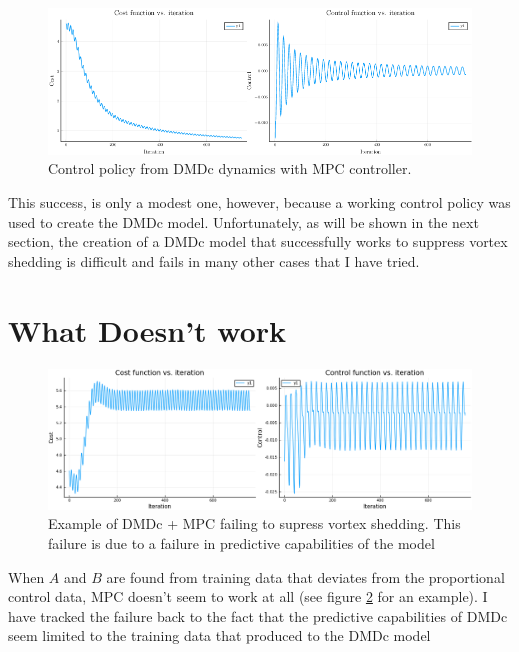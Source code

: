 \documentclass{article}
\begin{document}
\begin{figure}
  \centering
  \includegraphics[scale=0.5]{../images/dmdc_working.png}
  \caption{Control policy from DMDc dynamics with MPC controller.}
  \label{fig:dmdc_working}
\end{figure}


This success, is only a modest one, however, because a working control policy was used to create the DMDc model. Unfortunately, as will be shown in the next section, the creation of a DMDc model that successfully works to suppress vortex shedding is difficult and fails in many other cases that I have tried.

\section*{What Doesn't work}

\begin{figure}
  \includegraphics[scale=0.5]{../images/dmdc_offline_d1_resid_omega.png}
  \caption{Example of DMDc + MPC failing to supress vortex shedding. This failure is due to a failure in predictive capabilities of the model}
  \label{fig:failed_mpc}
\end{figure}

When $A$ and $B$ are found from training data that deviates from the proportional control data, MPC doesn't seem to work at all (see figure \ref{fig:failed_mpc} for an example). I have tracked the failure back to the fact that the predictive capabilities of DMDc seem limited to the training data that produced to the DMDc model
\end{document}
